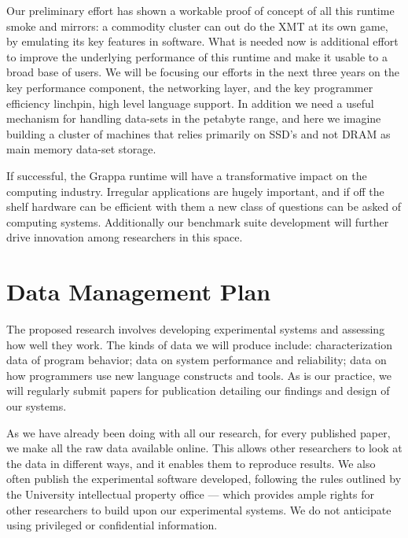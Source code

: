Our preliminary effort has shown a workable proof of concept of all this
runtime smoke and mirrors: a commodity cluster can out do the XMT at its own
game, by emulating its key features in software. What is needed now is
additional effort to improve the underlying performance of this runtime and
make it usable to a broad base of users. We will be focusing our efforts
in the next three years on the key performance component, the networking
layer, and the key programmer efficiency linchpin, high level language
support. In addition we need a useful mechanism for handling data-sets in the
petabyte range, and here we imagine building a cluster of machines that relies
primarily on SSD's and not DRAM as main memory data-set storage.

If successful, the Grappa runtime will have a transformative impact on the
computing industry. Irregular applications are hugely important, and if off
the shelf hardware can be efficient with them a new class of questions can be
asked of computing systems. Additionally our benchmark suite development will
further drive innovation among researchers in this space.



\newpage

\section*{Data Management Plan}

The proposed research involves developing experimental systems and
assessing how well they work. The kinds of data we will produce
include: characterization data of program behavior; data on system
performance and reliability; data on how programmers use new language
constructs and tools. As is our practice, we will regularly submit
papers for publication detailing our findings and design of our
systems.

As we have already been doing with all our research, for every
published paper, we make all the raw data available online. This
allows other researchers to look at the data in different ways, and it
enables them to reproduce results. We also often publish
the experimental software developed, following the rules outlined by
the University intellectual property office --- which provides ample
rights for other researchers to build upon our experimental
systems. We do not anticipate using privileged or confidential
information. 

